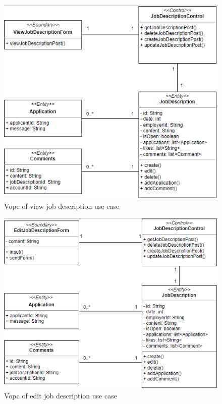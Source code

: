 \documentclass[a4paper]{article}
\begin{document}
\begin{figure}[H]
  \centering
  \includegraphics[width=1.0\textwidth]{vopc_view_jd.png}
  \caption{Vopc of view job description use case}
  \label{fig:fig27}
\end{figure}

\begin{figure}[H]
  \centering
  \includegraphics[width=1.0\textwidth]{vopc_edit_jd.png}
  \caption{Vopc of edit job description use case}
  \label{fig:fig28}
\end{figure}
\end{document}
